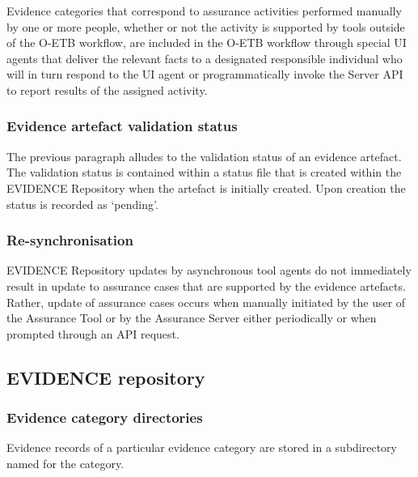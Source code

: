\documentclass[12pt,twoside,a4paper]{article}
\begin{document}
Evidence categories that correspond to assurance activities performed manually by one or more people, whether or not the activity is supported by tools outside of the O-ETB workflow, are included in the O-ETB workflow through special UI agents that deliver the relevant facts to a designated responsible individual who will in turn respond to the UI agent or programmatically invoke the Server API to report results of the assigned activity.

\hypertarget{evidence-artefact-validation-status}{%
\subsubsection{Evidence artefact validation status}\label{evidence-artefact-validation-status}}

The previous paragraph alludes to the validation status of an evidence artefact. The validation status is contained within a status file that is created within the EVIDENCE Repository when the artefact is initially created. Upon creation the status is recorded as `pending'.

\hypertarget{re-synchronisation}{%
\subsubsection{Re-synchronisation}\label{re-synchronisation}}

EVIDENCE Repository updates by asynchronous tool agents do not immediately result in update to assurance cases that are supported by the evidence artefacts. Rather, update of assurance cases occurs when manually initiated by the user of the Assurance Tool or by the Assurance Server either periodically or when prompted through an API request.

\hypertarget{evidence-repository-1}{%
\subsection{EVIDENCE repository}\label{evidence-repository-1}}

\hypertarget{evidence-category-directories}{%
\subsubsection{Evidence category directories}\label{evidence-category-directories}}

Evidence records of a particular evidence category are stored in a subdirectory named for the category.
\end{document}
